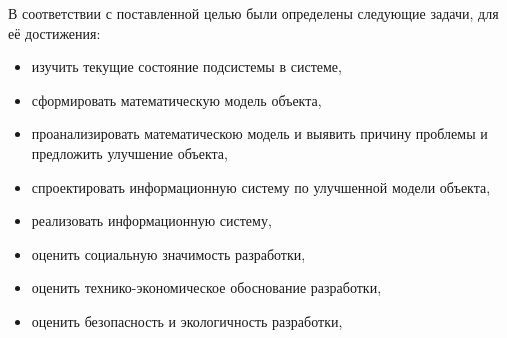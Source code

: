 В соответствии с поставленной целью были определены следующие задачи, для её достижения:
\begin{itemize}
    \item изучить текущие состояние подсистемы в системе,
    \item сформировать математическую модель объекта,
    \item проанализировать математическою модель и выявить причину проблемы и предложить улучшение объекта, 
    \item спроектировать информационную систему по улучшенной модели объекта,
    \item реализовать информационную систему,
    \item оценить социальную значимость разработки,  
    \item оценить технико-экономическое обоснование разработки,
    \item оценить безопасность и экологичность разработки,
\end{itemize}

 
\pagebreak